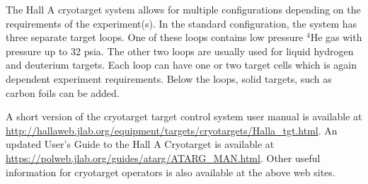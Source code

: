 

The Hall A cryotarget system allows for multiple configurations depending
on the requirements of the experiment(s). In the standard configuration,
the system has three separate target loops. One of these loops contains
low pressure $^{4}$He gas with pressure up to 32 psia. The other
two loops are usually used for liquid hydrogen and deuterium targets.
Each loop can have one or two target cells which is again dependent
experiment requirements.   Below the loops, solid targets, such as carbon foils
can be added.   

A short version of the cryotarget target control system user manual
is available at \url{http://hallaweb.jlab.org/equipment/targets/cryotargets/Halla\_tgt.html}.
An updated User's Guide to the Hall A Cryotarget is available at \url{https://polweb.jlab.org/guides/atarg/ATARG\_MAN.html}.
Other useful information for cryotarget operators is also available
at the above web sites.

